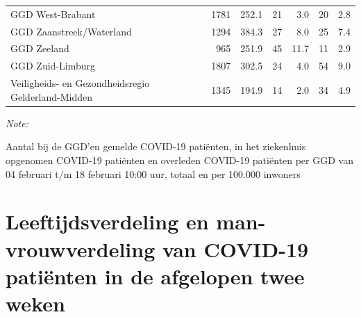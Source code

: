 \documentclass[
  english,
  man,floatsintext]{apa6}
\begin{document}
\begin{table}[H]
\begin{threeparttable}
\begin{tabular}{lrrrrrr}
GGD West-Brabant & 1781 & 252.1 & 21 & 3.0 & 20 & 2.8\\
GGD Zaanstreek/Waterland & 1294 & 384.3 & 27 & 8.0 & 25 & 7.4\\
GGD Zeeland & 965 & 251.9 & 45 & 11.7 & 11 & 2.9\\
GGD Zuid-Limburg & 1807 & 302.5 & 24 & 4.0 & 54 & 9.0\\
Veiligheids- en Gezondheidsregio Gelderland-Midden & 1345 & 194.9 & 14 & 2.0 & 34 & 4.9\\
\bottomrule
\end{tabular}
\begin{tablenotes}
\item \textit{Note: } 
\item Aantal bij de GGD’en gemelde COVID-19 patiënten, in het ziekenhuis opgenomen COVID-19 patiënten en overleden COVID-19 patiënten per GGD van 04 februari t/m 18 februari 10:00 uur, totaal en per 100.000 inwoners
\end{tablenotes}
\end{threeparttable}
\endgroup{}
\end{table}

\newpage

\hypertarget{leeftijdsverdeling-en-man-vrouwverdeling-van-covid-19-patiuxebnten-in-de-afgelopen-twee-weken}{%
\section{Leeftijdsverdeling en man-vrouwverdeling van COVID-19 patiënten in de afgelopen twee weken}\label{leeftijdsverdeling-en-man-vrouwverdeling-van-covid-19-patiuxebnten-in-de-afgelopen-twee-weken}}
\end{document}
